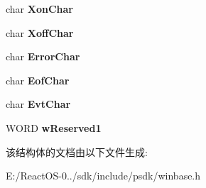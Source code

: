 \begin{DoxyCompactItemize}
\mbox{\label{struct___d_c_b_ae017c9e74504698eb41d976253cc3929}} 
char {\bfseries Xon\+Char}
\item 
\mbox{\label{struct___d_c_b_a85de417db7a1b836adf1ede63bf2c257}} 
char {\bfseries Xoff\+Char}
\item 
\mbox{\label{struct___d_c_b_a6bfe6298e093d1de297aef243bfedecd}} 
char {\bfseries Error\+Char}
\item 
\mbox{\label{struct___d_c_b_acea7228126fd91c67f5eb7a610948c25}} 
char {\bfseries Eof\+Char}
\item 
\mbox{\label{struct___d_c_b_a72d78a0e47928025e81751e6bbeb7e56}} 
char {\bfseries Evt\+Char}
\item 
\mbox{\label{struct___d_c_b_aa8560ae542b3e346263b5cc7a1cf91fa}} 
W\+O\+RD {\bfseries w\+Reserved1}
\end{DoxyCompactItemize}


该结构体的文档由以下文件生成\+:\begin{DoxyCompactItemize}
\item 
E\+:/\+React\+O\+S-\/0../sdk/include/psdk/winbase.\+h\end{DoxyCompactItemize}
